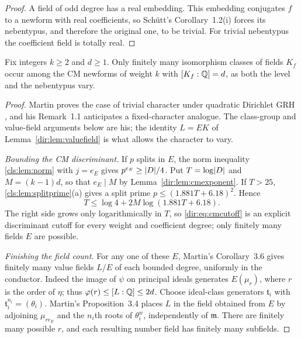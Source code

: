 \begin{proof}
A field of odd degree has a real embedding. This embedding conjugates $f$ to a newform
with real coefficients, so Sch\"utt's Corollary~1.2(i) \cite{Schutt2005CM} forces its
nebentypus, and therefore the original one, to be trivial. For trivial nebentypus the
coefficient field is totally real.
\end{proof}

\begin{theorem}\label{dir:thm:cmfinite}
Fix integers $k\ge2$ and $d\ge1$. Only finitely many isomorphism classes of fields
$K_f$ occur among the CM newforms of weight $k$ with $[K_f:\mathbb{Q}]=d$, as both the level
and the nebentypus vary.
\end{theorem}

\begin{proof}
Martin proves the case of trivial character under quadratic Dirichlet GRH
\cite[Theorem~1]{Martin2025Rationality}, and his Remark~1.1 anticipates a
fixed-character analogue. The class-group and value-field arguments below are his; the
identity $L=EK$ of Lemma~\ref{dir:lem:valuefield} is what allows the character to vary.

\emph{Bounding the CM discriminant.} If $p$ splits in $E$, the norm inequality
\cref{cls:lem:norm} with $j=e_E$ gives $p^{e_E}\ge\lvert D\rvert/4$.
Put $T=\log\lvert D\rvert$ and $M=(k-1)d$, so that $e_E\mid M$ by Lemma~\ref{dir:lem:cmexponent}.
If $T>25$, \cref{cls:lem:splitprime}(a) gives a split prime $p\le(1.881T+6.18)^2$. Hence
\begin{equation}\label{dir:eq:cmcutoff}
 T\le\log4+2M\log(1.881T+6.18).
\end{equation}
The right side grows only logarithmically in $T$, so \eqref{dir:eq:cmcutoff} is an
explicit discriminant cutoff for every weight and coefficient degree; only finitely
many fields $E$ are possible.

\emph{Finishing the field count.} For any one of these $E$, Martin's Corollary~3.6
gives finitely many value fields $L/E$ of each bounded degree, uniformly in the
conductor. Indeed the image of $\psi$ on principal ideals generates $E(\mu_r)$, where
$r$ is the order of $\eta$; thus $\varphi(r)\le[L:\mathbb{Q}]\le2d$. Choose ideal-class
generators $\mathfrak t_i$ with $\mathfrak t_i^{n_i}=(\theta_i)$. Martin's
Proposition~3.4 places $L$ in the field obtained from $E$ by adjoining $\mu_{re_E}$ and
the $n_i$th roots of $\theta_i^w$, independently of $\mathfrak m$. There are finitely
many possible $r$, and each resulting number field has finitely many subfields.
\end{proof}

